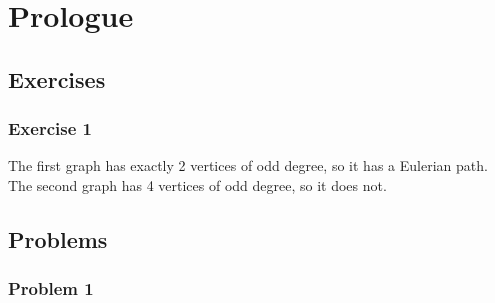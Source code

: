\section{Prologue}

\subsection{Exercises}

\subsubsection{Exercise 1}
The first graph has exactly 2 vertices of odd degree, so it has a Eulerian path. The second graph has 4 
vertices of odd degree, so it does not. 

\subsection{Problems}

\subsubsection{Problem 1}

